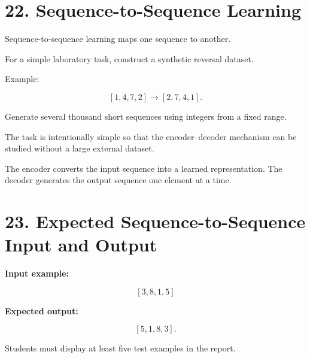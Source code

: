 \documentclass[10pt]{article}
\begin{document}

\section*{22. Sequence-to-Sequence Learning}

Sequence-to-sequence learning maps one sequence to another.

For a simple laboratory task, construct a synthetic reversal dataset.

Example:

\[
[1,4,7,2]\rightarrow[2,7,4,1].
\]

Generate several thousand short sequences using integers from a fixed range.

The task is intentionally simple so that the encoder--decoder mechanism can
be studied without a large external dataset.

\begin{center}
\end{center}

The encoder converts the input sequence into a learned representation.
The decoder generates the output sequence one element at a time.

\section*{23. Expected Sequence-to-Sequence Input and Output}

\textbf{Input example:}

\[
[3,8,1,5]
\]

\textbf{Expected output:}

\[
[5,1,8,3].
\]

Students must display at least five test examples in the report.
\end{document}
